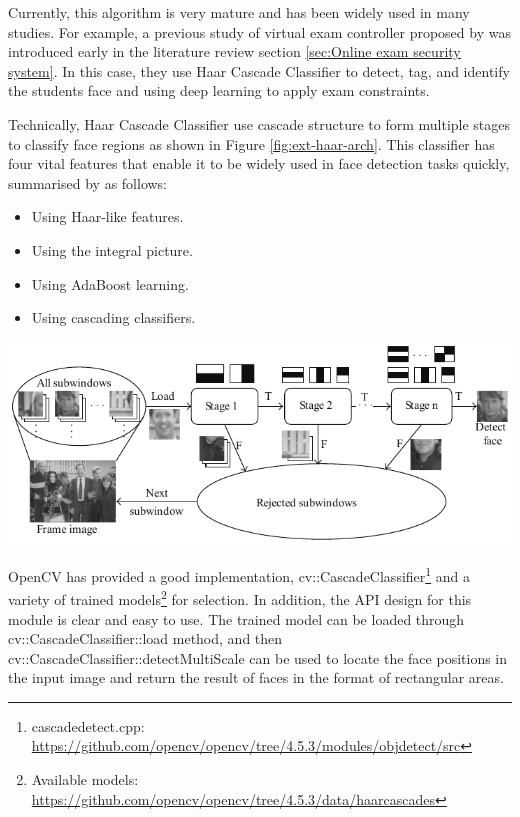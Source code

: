 Currently, this algorithm is very mature and has been widely used in many studies.
For example, a previous study of virtual exam controller proposed by \citet{garg2020convolutional} was introduced early in the literature review section \ref{sec:Online exam security system}.
In this case, they use Haar Cascade Classifier to detect, tag, and identify the students face and using deep learning to apply exam constraints.

Technically, Haar Cascade Classifier use cascade structure to form multiple stages to classify face regions as shown in Figure \ref{fig:ext-haar-arch}.
This classifier has four vital features that enable it to be widely used in face detection tasks quickly, summarised by \citet{garg2020convolutional} as follows:

\begin{minipage}{\textwidth}
    \begin{minipage}{.4\textwidth}
        \begin{itemize}
            \item Using Haar-like features.
            \item Using the integral picture.
            \item Using AdaBoost learning.
            \item Using cascading classifiers.
        \end{itemize}
    \end{minipage}
    \begin{minipage}{.58\textwidth}
        \centering
        \captionsetup{type=figure}
        \includegraphics[width=\textwidth]{design/imgs/ext-haar-arch.pdf}
        \label{fig:ext-haar-arch}
    \end{minipage}
\end{minipage}

OpenCV has provided a good implementation, cv::CascadeClassifier\footnote{cascadedetect.cpp: \url{https://github.com/opencv/opencv/tree/4.5.3/modules/objdetect/src}} and a variety of trained models\footnote{Available models: \url{https://github.com/opencv/opencv/tree/4.5.3/data/haarcascades}} for selection.
In addition, the API design for this module is clear and easy to use.
The trained model can be loaded through cv::CascadeClassifier::load method, and then cv::CascadeClassifier::detectMultiScale can be used to locate the face positions in the input image and return the result of faces in the format of rectangular areas.

